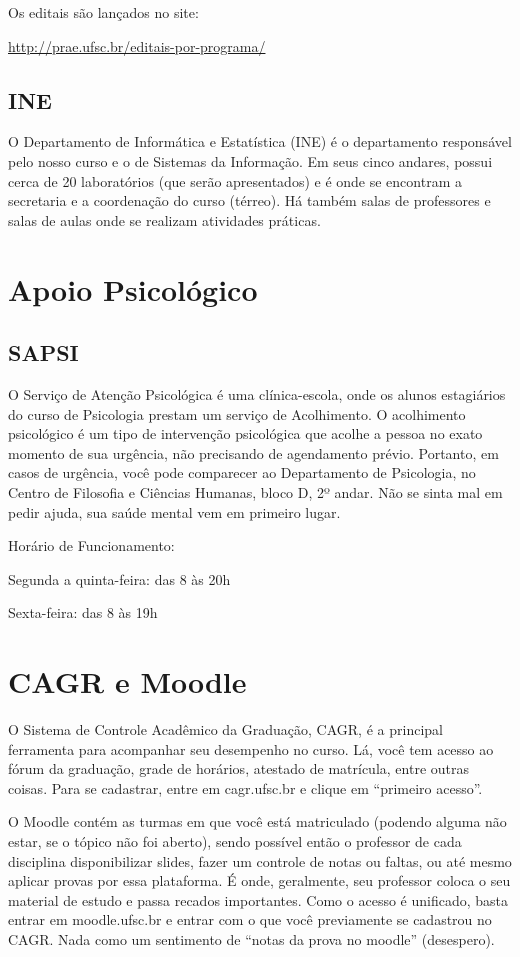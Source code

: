 \documentclass{article}
\begin{document}
Os editais são lançados no site:

\url{http://prae.ufsc.br/editais-por-programa/}

\subsection{INE}
O Departamento de Informática e Estatística (INE) é o departamento responsável pelo nosso curso e o de Sistemas da Informação. Em seus cinco andares, possui cerca de 20 laboratórios (que serão apresentados) e é onde se encontram a secretaria e a coordenação do curso (térreo). Há também salas de professores e salas de aulas onde se realizam atividades práticas.

\section{Apoio Psicológico}
\subsection{SAPSI}
O Serviço de Atenção Psicológica é uma clínica-escola, onde os alunos estagiários do curso de Psicologia  prestam um serviço de Acolhimento. O acolhimento psicológico é um tipo de intervenção psicológica que acolhe a pessoa no exato momento de sua urgência, não precisando de agendamento prévio. Portanto, em casos de urgência, você pode comparecer ao Departamento de Psicologia, no Centro de Filosofia e Ciências Humanas, bloco D, 2º andar. Não se sinta mal em pedir ajuda, sua saúde mental vem em primeiro lugar.

Horário de Funcionamento:


Segunda a quinta-feira: das 8 às 20h

Sexta-feira: das 8 às 19h
\section{CAGR e Moodle}

O Sistema de Controle Acadêmico da Graduação, CAGR, é a principal ferramenta para acompanhar seu desempenho no curso. Lá, você tem acesso ao fórum da graduação, grade de horários, atestado de matrícula, entre outras coisas. Para se cadastrar, entre em cagr.ufsc.br e clique em “primeiro acesso”.

O Moodle contém as turmas em que você está matriculado (podendo alguma não estar, se o tópico não foi aberto), sendo possível então o professor de cada disciplina disponibilizar slides, fazer um controle de notas ou faltas, ou até mesmo aplicar provas por essa plataforma. É onde, geralmente, seu professor coloca o seu material de estudo e passa recados importantes. Como o acesso é unificado, basta entrar em moodle.ufsc.br e entrar com o que você previamente se cadastrou no CAGR. Nada como um sentimento de “notas da prova no moodle” (desespero).
\end{document}
